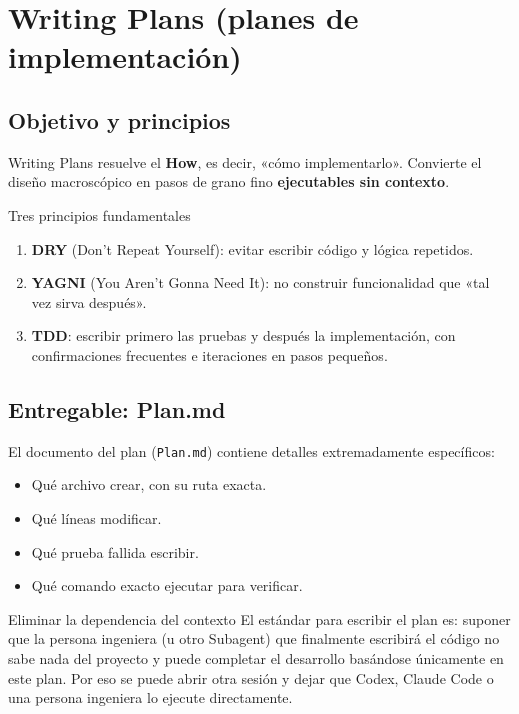 \section{Writing Plans (planes de implementación)}

\subsection{Objetivo y principios}

Writing Plans resuelve el \textbf{How}, es decir, «cómo implementarlo». Convierte el diseño macroscópico en pasos de grano fino \textbf{ejecutables sin contexto}.

\begin{importantbox}{Tres principios fundamentales}
\begin{enumerate}
    \item \textbf{DRY} (Don't Repeat Yourself): evitar escribir código y lógica repetidos.
    \item \textbf{YAGNI} (You Aren't Gonna Need It): no construir funcionalidad que «tal vez sirva después».
    \item \textbf{TDD}: escribir primero las pruebas y después la implementación, con confirmaciones frecuentes e iteraciones en pasos pequeños.
\end{enumerate}
\end{importantbox}

\subsection{Entregable: Plan.md}

El documento del plan (\texttt{Plan.md}) contiene detalles extremadamente específicos:
\begin{itemize}
    \item Qué archivo crear, con su ruta exacta.
    \item Qué líneas modificar.
    \item Qué prueba fallida escribir.
    \item Qué comando exacto ejecutar para verificar.
\end{itemize}

\begin{knowledgebox}{Eliminar la dependencia del contexto}
El estándar para escribir el plan es: suponer que la persona ingeniera (u otro Subagent) que finalmente escribirá el código no sabe nada del proyecto y puede completar el desarrollo basándose únicamente en este plan. Por eso se puede abrir otra sesión y dejar que Codex, Claude Code o una persona ingeniera lo ejecute directamente.
\end{knowledgebox}

